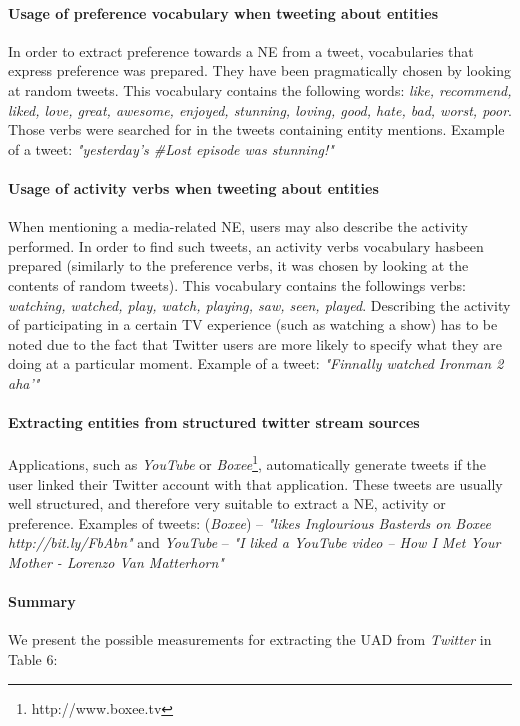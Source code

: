 \paragraph{Usage of preference vocabulary when tweeting about entities}
In order to extract preference towards a NE from a tweet, vocabularies that express
preference was prepared. They have been pragmatically chosen by looking at random tweets.
This vocabulary contains the following words: \textit{like, recommend, liked, love, great,
awesome, enjoyed, stunning, loving, good, hate, bad, worst, poor}.
Those verbs were searched for in the tweets containing entity mentions.
Example of a tweet: \textit{"yesterday's \#Lost episode was stunning!"}
\paragraph{Usage of activity verbs when tweeting about entities}
When mentioning a media-related NE, users may also describe the activity performed.
In order to find such tweets, an activity verbs vocabulary hasbeen prepared (similarly to
the preference verbs, it was chosen by looking at the contents of random tweets).
This vocabulary contains the followings verbs: \textit{watching, watched, play,
watch, playing, saw, seen, played}.
Describing the activity of participating in a certain TV experience (such
as watching a show) has to be noted due to the fact that Twitter users are more
likely to specify what they are doing at a particular moment.
Example of a tweet: \textit{"Finnally watched Ironman 2 aha'"}

\paragraph{Extracting entities from structured twitter stream sources}
Applications, such as \textit{YouTube} or \textit{Boxee}\footnote{http://www.boxee.tv}, automatically generate tweets
if the user linked their Twitter account with that application. These tweets are
usually well structured, and therefore very suitable to extract a NE, activity or preference.
Examples of tweets: (\textit{Boxee}) -- \textit{"likes Inglourious Basterds on Boxee http://bit.ly/FbAbn"} and
\textit{YouTube} -- \textit{"I liked a YouTube video -- How I Met Your Mother - Lorenzo Van Matterhorn"}

\paragraph{Summary}
We present the possible measurements for extracting the UAD from \textit{Twitter} in Table 6:

